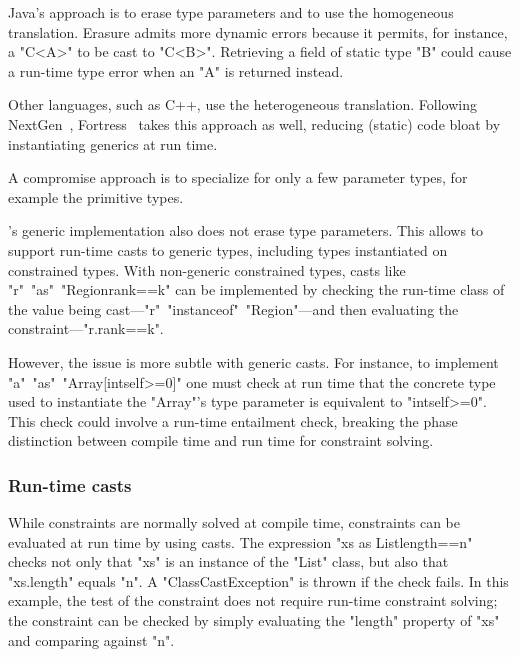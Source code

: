 Java's approach is to erase type parameters and to use the homogeneous
translation.  Erasure admits more dynamic errors because
it permits, for instance, a \xcd"C<A>" to be cast to \xcd"C<B>".
Retrieving a field of static type \xcd"B" could cause a run-time
type error when an \xcd"A" is returned instead.

Other languages, such as C++, use the heterogeneous
translation.  Following NextGen~\cite{nextgen},
Fortress~\cite{fortress} takes this approach as well, reducing
(static) code bloat by instantiating generics at run time.

A compromise approach is to specialize for only a few parameter
types, for example the primitive types.

\Xten's generic implementation also does not erase type
parameters.  This allows \Xten to support run-time casts to 
generic types, including types instantiated on constrained
types.
With
non-generic constrained types, casts like
\xcd"r"~\xcd"as"~\xcd"Region{rank==k}" can be implemented by
checking the run-time class of the value being
cast---\xcd"r"~\xcd"instanceof"~\xcd"Region"---and then
evaluating the constraint---\xcd"r.rank==k".

However, the issue is more subtle with generic casts.
For instance, to implement
\xcd"a"~\xcd"as"~\xcd"Array[int{self>=0}]"
one must check at run time that the concrete type used to instantiate
the \xcd"Array"'s type parameter is equivalent to
\xcd"int{self>=0}".  This check could involve a run-time
entailment check, 
breaking the phase distinction between
compile time and run time for constraint solving.

\subsubsection{Run-time casts}
\label{sec:casts}

While constraints are normally solved at compile time, 
constraints can be evaluated at run time by using casts.
The expression 
\xcd"xs as List{length==n}" checks not only 
that \xcd"xs"
is an instance of
the \xcd"List" class, but also that \xcd"xs.length" equals \xcd"n".
A \xcd"ClassCastException" is thrown if the check fails.
%
In this example, the test of the constraint does not require
run-time constraint
solving; the constraint can be checked by simply
evaluating the \xcd"length" property of \xcd"xs" and comparing against \xcd"n".

